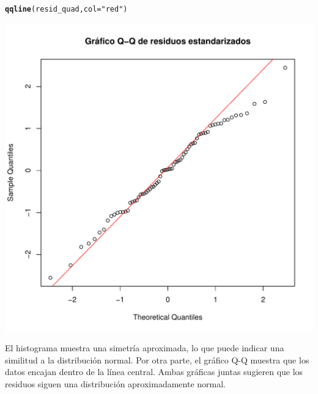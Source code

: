 \documentclass[12pt]{article}\usepackage[]{graphicx}\usepackage[]{xcolor}
\makeatletter
\def\maxwidth{ %
  \ifdim\Gin@nat@width>\linewidth
    \linewidth
  \else
    \Gin@nat@width
  \fi
}
\newcommand{\hlsng}[1]{\textcolor[rgb]{0.192,0.494,0.8}{#1}}%
\newcommand{\hldef}[1]{\textcolor[rgb]{0.345,0.345,0.345}{#1}}%
\newcommand{\hlkwc}[1]{\textcolor[rgb]{0.333,0.667,0.333}{#1}}%
\newcommand{\hlkwd}[1]{\textcolor[rgb]{0.737,0.353,0.396}{\textbf{#1}}}%
\newenvironment{kframe}{%
 \def\at@end@of@kframe{}%
 \ifinner\ifhmode%
  \def\at@end@of@kframe{\end{minipage}}%
  \begin{minipage}{\columnwidth}%
 \fi\fi%
 \def\FrameCommand##1{\hskip\@totalleftmargin \hskip-\fboxsep
 \colorbox{shadecolor}{##1}\hskip-\fboxsep
     \hskip-\linewidth \hskip-\@totalleftmargin \hskip\columnwidth}%
 \MakeFramed {\advance\hsize-\width
   \@totalleftmargin\z@ \linewidth\hsize
   \@setminipage}}%
 {\par\unskip\endMakeFramed%
 \at@end@of@kframe}
\newenvironment{knitrout}{}{} %
\makeatother
\begin{document}
\begin{knitrout}
\begin{kframe}
\begin{alltt}
\hlkwd{qqline}\hldef{(resid_quad,} \hlkwc{col} \hldef{=} \hlsng{"red"}\hldef{)}
\end{alltt}
\end{kframe}
\includegraphics[width=\maxwidth]{figure/unnamed-chunk-19-2} 
\end{knitrout}


El histograma muestra una simetría aproximada, lo que puede indicar una similitud a la distribución normal. Por otra parte, el gráfico Q-Q muestra que los datos encajan dentro de la línea central. Ambas gráficas juntas sugieren que los residuos siguen una distribución aproximadamente normal.

\printbibliography
\end{document}
